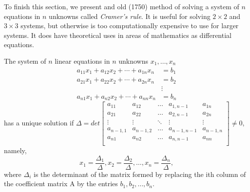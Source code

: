 \documentclass[../main.tex]{subfiles}
\begin{document}
\noindent To finish this section, we present and old (1750) method of solving a system of \(n\) equations in \(n\) unknowns called \emph{Cramer's rule}. It is useful for solving \(2 \times 2\) and \(3 \times 3\) systems, but otherwise is too computationally expensive to use for larger systems. It does have theoretical uses in areas of mathematics as differential equations.

\begin{theorem} \label{th:4_6}
  The system of \(n\) linear equations in \(n\) unknowns \(x_1, \hdots, x_n\)
  \begin{equation*}
    \begin{aligned}
      a_{11}x_1 + a_{12}x_2 + \cdots + a_{1n}x_n &= b_1\\
      a_{21}x_1 + a_{22}x_2 + \cdots + a_{2n}x_n &= b_2\\
      & \vdots\\
      a_{n1}x_1 + a_{n2}x_2 + \cdots + a_{nn}x_n &= b_n
    \end{aligned}
  \end{equation*}
  has a unique solution if \(\Delta = det\begin{bmatrix}
    a_{11} & a_{12} & \hdots & a_{1,n-1} & a_{1n}\\
    a_{21} & a_{22} & \hdots & a_{2,n-1} & a_{2n}\\
    \vdots & \vdots & \ddots & \vdots & \vdots\\
    a_{n-1,1} & a_{n-1,2} & \hdots & a_{n-1,n-1} & a_{n-1,n}\\
    a_{n1} & a_{n2} & \hdots & a_{n,n-1} & a_{nn}\\
  \end{bmatrix}
  \neq 0\),
  namely,
  \begin{equation*}
    x_1 = \frac{\Delta_1}{\Delta}, x_2 = \frac{\Delta_2}{\Delta}, \hdots, x_n = \frac{\Delta_n}{\Delta},
  \end{equation*}
  where \(\Delta_i\) is the determinant of the matrix formed by replacing the ith column of the coefficient matrix A by the entries \(b_1, b_2, \hdots, b_n\).

\end{theorem}
\end{document}
